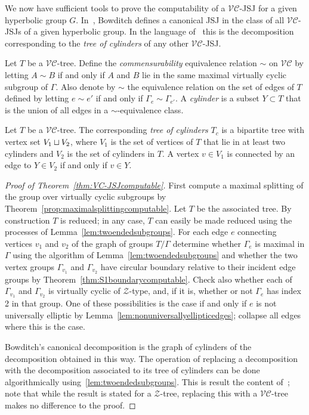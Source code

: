 We now have sufficient tools to prove the computability of a $\mathcal{VC}$-JSJ
for a given hyperbolic group $G$. In~\cite{bowditch98}, Bowditch defines a
canonical JSJ in the class of all $\mathcal{VC}$-JSJs of a given hyperbolic
group. In the language of~\cite{guirardellevitt16} this is the decomposition
corresponding to the \emph{tree of cylinders} of any other $\mathcal{VC}$-JSJ.

\begin{defn} Let $T$ be a $\mathcal{VC}$-tree. Define the \emph{commensurability}
equivalence relation $\sim$ on $\mathcal{VC}$ by letting $A \sim B$ if
and only if $A$ and $B$ lie in the same maximal virtually cyclic subgroup of
$\Gamma$. Also denote by $\sim$ the equivalence relation on the set of
edges of $T$ defined by letting $e \sim e'$ if and only if $\Gamma_e \sim
\Gamma_{e'}$. A \emph{cylinder} is a subset $Y\subset T$ that is the union of
all edges in a $\sim$-equivalence class.\end{defn}

\begin{defn} Let $T$ be a $\mathcal{VC}$-tree. The corresponding \emph{tree of
  cylinders} $T_c$ is a bipartite tree with vertex set $V_1 \sqcup
  V_2$, where $V_1$ is the set of vertices of $T$ that lie in at least two
  cylinders and $V_2$ is the set of cylinders in $T$. A vertex $v \in V_1$ is
connected by an edge to $Y \in V_2$ if and only if $v \in Y$.\end{defn}

\begin{proof}[Proof of Theorem~\ref{thm:VC-JSJcomputable}] First compute a
maximal splitting of the group over virtually cyclic subgroups by
Theorem~\ref{prop:maximalsplittingcomputable}. Let $T$ be the associated
tree. By construction $T$ is reduced; in any case, $T$ can easily be made
reduced using the processes of Lemma~\ref{lem:twoendedsubgroups}. For each
edge $e$ connecting vertices $v_1$ and $v_2$ of the graph of groups
$T/\Gamma$ determine whether $\Gamma_e$ is maximal in $\Gamma$ using the
algorithm of Lemma~\ref{lem:twoendedsubgroups} and whether the two vertex
groups $\Gamma_{v_1}$ and $\Gamma_{v_2}$ have circular boundary relative to
their incident edge groups by Theorem~\ref{thm:S1boundarycomputable}. Check
also whether each of $\Gamma_{v_1}$ and $\Gamma_{v_2}$ is virtually cyclic of
$\mathcal{Z}$-type, and, if it is, whether or not $\Gamma_e$ has index 2{} in
that group. One of these possibilities is the case if and only if $e$ is not
universally elliptic by Lemma~\ref{lem:nonuniversallyellipticedges}; collapse
all edges where this is the case.

Bowditch's canonical decomposition is the graph of cylinders of the
decomposition obtained in this way. The operation of replacing a decomposition
with the decomposition associated to its tree of cylinders can be done
algorithmically using~\ref{lem:twoendedsubgroups}. This is result the content
of~\cite[Lemma 2.34]{dahmaniguirardel11}; note that while the result is stated
for a $\mathcal{Z}$-tree, replacing this with a $\mathcal{VC}$-tree makes no
difference to the proof.\end{proof}

